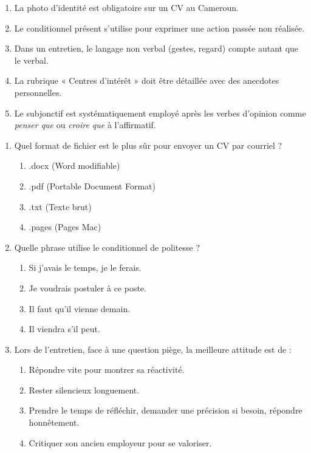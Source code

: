 \documentclass[11pt]{article}
\begin{document}
\begin{exercice}
\begin{enumerate}
    \item La photo d'identité est obligatoire sur un CV au Cameroun.
    \item Le conditionnel présent s'utilise pour exprimer une action passée non réalisée.
    \item Dans un entretien, le langage non verbal (gestes, regard) compte autant que le verbal.
    \item La rubrique « Centres d'intérêt » doit être détaillée avec des anecdotes personnelles.
    \item Le subjonctif est systématiquement employé après les verbes d'opinion comme \textit{penser que} ou \textit{croire que} à l'affirmatif.
\end{enumerate}
\end{exercice}

\begin{exercice}
\begin{enumerate}
    \item Quel format de fichier est le plus sûr pour envoyer un CV par courriel ?
    \begin{enumerate}
        \item .docx (Word modifiable)
        \item .pdf (Portable Document Format)
        \item .txt (Texte brut)
        \item .pages (Pages Mac)
    \end{enumerate}
    \item Quelle phrase utilise le conditionnel de politesse ?
    \begin{enumerate}
        \item Si j'avais le temps, je le ferais.
        \item Je voudrais postuler à ce poste.
        \item Il faut qu'il vienne demain.
        \item Il viendra s'il peut.
    \end{enumerate}
    \item Lors de l'entretien, face à une question piège, la meilleure attitude est de :
    \begin{enumerate}
        \item Répondre vite pour montrer sa réactivité.
        \item Rester silencieux longuement.
        \item Prendre le temps de réfléchir, demander une précision si besoin, répondre honnêtement.
        \item Critiquer son ancien employeur pour se valoriser.
    \end{enumerate}
\end{enumerate}
\end{exercice}
\end{document}
